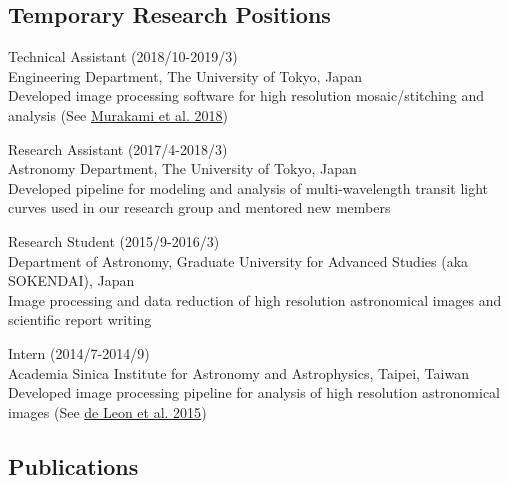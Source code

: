 \documentclass[12pt,letterpaper]{article}
\begin{document}
\subsection{Temporary Research Positions}
\begin{list}{}{\cvlist}
    \item Technical Assistant (2018/10-2019/3)\\
          Engineering Department, The University of Tokyo, Japan\\
          Developed image processing software for high resolution mosaic/stitching and analysis (See \href{\spieurl}{Murakami et al. 2018})
    \item Research Assistant (2017/4-2018/3)\\	
          Astronomy Department, The University of Tokyo, Japan\\
          Developed pipeline for modeling and analysis of multi-wavelength transit light curves used in our research group and mentored new members
    \item Research Student (2015/9-2016/3)\\
          Department of Astronomy, Graduate University for Advanced Studies (aka SOKENDAI), Japan\\
          Image processing and data reduction of high resolution astronomical images and scientific report writing
    \item Intern (2014/7-2014/9)\\
          Academia Sinica Institute for Astronomy and Astrophysics, Taipei, Taiwan\\	
          Developed image processing pipeline for analysis of high resolution astronomical images (See \href{\paperone}{de Leon et al. 2015})
\end{list}

%   

\ifdefined\withpubs
  \subsection{Publications}
  
  \begin{list}{}{\cvlist}
    
  \end{list}
\end{document}
